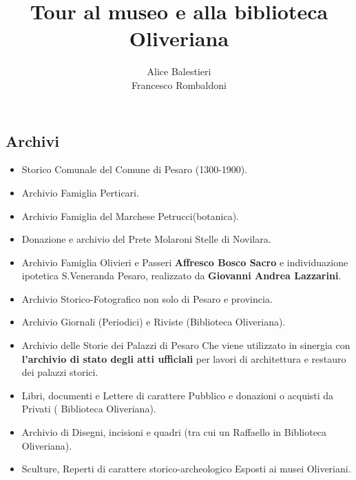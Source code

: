 \documentclass[hidelinks,12pt,a4paper]{article}
\begin{document}
	\begin{flushleft}
		
		\title{\textbf{Tour al museo e alla biblioteca Oliveriana}}
		\author{Alice Balestieri\\Francesco Rombaldoni}
		\date{}
		
		\maketitle
		\setcounter{page}{1}
		\newpage
		
		\tableofcontents
		\newpage
		
		\section{Archivi}
		
		\begin{itemize}
			\item Storico Comunale del Comune di Pesaro (1300-1900).
			\item Archivio Famiglia Perticari.
			\item Archivio Famiglia del Marchese Petrucci(botanica).
			\item Donazione e archivio del Prete Molaroni \textrightarrow Stelle di Novilara.
			\item Archivio Famiglia Olivieri e Passeri \textrightarrow \textbf{Affresco Bosco Sacro} e individuazione ipotetica S.Veneranda Pesaro, realizzato da \textbf{Giovanni Andrea Lazzarini}.
			\item Archivio Storico-Fotografico non solo di Pesaro e provincia.
			\item Archivio Giornali (Periodici) e Riviste (Biblioteca Oliveriana).
			\item Archivio delle Storie dei Palazzi di Pesaro \textrightarrow Che viene utilizzato in sinergia con \textbf{l'archivio di stato degli atti ufficiali} per lavori di architettura e restauro dei palazzi storici.
			\item Libri, documenti e Lettere di carattere Pubblico e donazioni o acquisti da Privati ( Biblioteca Oliveriana).
			\item Archivio di Disegni, incisioni e quadri (tra cui un Raffaello in Biblioteca Oliveriana).
			\item Sculture, Reperti di carattere storico-archeologico \textrightarrow Esposti ai musei Oliveriani.			
		\end{itemize}
	

\end{flushleft}
\end{document}

